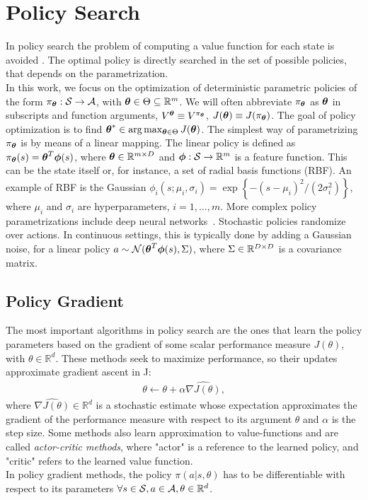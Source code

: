 \section{Policy Search}\label{sec:polser}
In policy search the problem of computing a value function for each state is avoided . The optimal policy is directly searched in the set of possible policies, that depends on the parametrization.\\
\newline
In this work, we focus on the optimization of deterministic parametric policies of the form $\pi_{\boldsymbol{\theta}}:\mathcal{S}\to\mathcal{A}$, with $\boldsymbol{\theta}\in\Theta\subseteq\mathbb{R}^m$. We will often abbreviate $\pi_{\boldsymbol{\theta}}$ as $\boldsymbol{\theta}$ in subscripts and function arguments, \eg $V^{\boldsymbol{\theta}} \equiv V^{\pi_{\boldsymbol{\theta}}}$, $J(\boldsymbol{\theta}) \equiv J(\pi_{\boldsymbol{\theta}})$. The goal of policy optimization is to find $\boldsymbol{\theta}^{*}\in\arg\max_{\boldsymbol{\theta}\in\Theta}J({\boldsymbol{\theta}})$.
The simplest way of parametrizing $\pi_{\boldsymbol{\theta}}$ is by means of a linear mapping. The linear policy is defined as $\pi_{\boldsymbol{\theta}}(s) = \boldsymbol{\theta}^T\boldsymbol{\phi}(s)$, where $\boldsymbol{\theta}\in\mathbb{R}^{m\times D}$ and $\boldsymbol{\phi}:\mathcal{S}\to\mathbb{R}^m$ is a feature function. This can be the state itself or, for instance, a set of radial basis functions (RBF). An example of RBF is the Gaussian $\phi_i(s; \mu_i, \sigma_i) = \exp\left\{-{(s -\mu_i)^2}\big/{(2\sigma_i^2)}\right\}$, where $\mu_i$ and $\sigma_i$ are hyperparameters, $i=1,\dots,m$. More complex policy parametrizations include deep neural networks~\citep{duan2016benchmarking}. 
Stochastic policies randomize over actions. In continuous settings, this is typically done by adding a Gaussian noise, \eg for a linear policy $a\sim\mathcal{N}(\boldsymbol{\theta}^T\boldsymbol{\phi}(s),\Sigma)$, where $\Sigma\in\mathbb{R}^{D\times D}$ is a covariance matrix.

\subsection{Policy Gradient}
The most important algorithms in policy search are the ones that learn the policy parameters based on the gradient of some scalar performance measure $J(\theta)$, with $\theta \in \mathbb{R}^d$. These methods seek to maximize performance, so their updates approximate gradient ascent in J:
\begin{align}
\theta \leftarrow \theta + \alpha \widehat{\nabla J(\theta)}, \label{eq:grad}
\end{align}
where $\widehat{\nabla J(\theta)} \in \mathbb{R}^d$ is a stochastic estimate whose expectation approximates the gradient of the performance measure with respect to its argument $\theta$ and $\alpha$ is the step size. Some methods also learn approximation to value-functions and are called \emph{actor-critic methods}, where "actor" is a reference to the learned policy, and "critic" refers to the learned value function.\\
\newline
In policy gradient methods, the policy $\pi(a|s,\theta)$ has to be differentiable with respect to its parameters $\forall s \in \mathcal{S}, a \in \mathcal{A}, \theta \in \mathbb{R}^d$.

